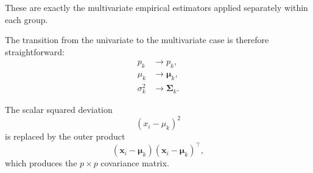 These are exactly the multivariate empirical estimators applied
separately within each group.

The transition from the univariate to the multivariate case is
therefore straightforward:
\begin{equation*}
\boxed{
\begin{aligned}
p_k
&\longrightarrow p_k,\\
\mu_k
&\longrightarrow \boldsymbol{\mu}_k,\\
\sigma_k^2
&\longrightarrow \boldsymbol{\Sigma}_k.
\end{aligned}
}
\end{equation*}

The scalar squared deviation
\begin{equation*}
(x_i-\mu_k)^2
\end{equation*}
is replaced by the outer product
\begin{equation*}
(\boldsymbol{x}_i-\boldsymbol{\mu}_k)
(\boldsymbol{x}_i-\boldsymbol{\mu}_k)^\top,
\end{equation*}
which produces the $p\times p$ covariance matrix.